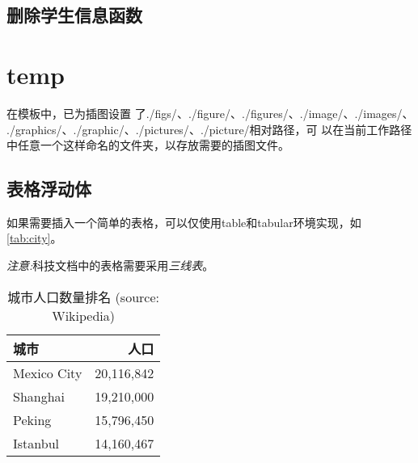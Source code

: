 \documentclass[
  ]{nwafuprojrep}
\begin{document}
\subsection{删除学生信息函数}


\section{temp}
\begin{figure}[!htp]
\end{figure}

在模板中，已为插图设置
了{{./figs/}、{./figure/}、{./figures/}、{./image/}、{./images/}、
  {./graphics/}、{./graphic/}、{./pictures/}、{./picture/}}相对路径，可
以在当前工作路径中任意一个这样命名的文件夹，以存放需要的插图文件。

\subsection{表格浮动体}
如果需要插入一个简单的表格，可以仅使用{table}和{tabular}环境实现，如%
\autoref{tab:city}。

\emph{注意:}科技文档中的表格需要采用\emph{三线表}。

\begin{table}[!htb]
  \caption[城市人口]{城市人口数量排名 (source: Wikipedia)\label{tab:city}}
  \begin{tabular}{lr}
    \toprule
    城市 & 人口 \\
    \midrule
    Mexico City & 20,116,842\\
    Shanghai & 19,210,000\\
    Peking & 15,796,450\\
    Istanbul & 14,160,467\\
    \bottomrule
  \end{tabular}
\end{table}
\end{document}
